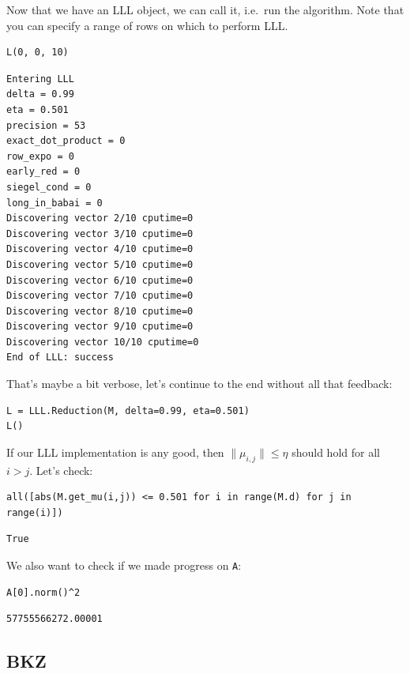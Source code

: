 \documentclass[10pt,a4paper,nobib]{tufte-handout}
\begin{document}
Now that we have an LLL object, we can call it, i.e. run the algorithm. Note that you can specify a range of rows on which to perform LLL.
\lstset{language=Python,label= ,caption= ,captionpos=b,numbers=none}
\begin{lstlisting}
L(0, 0, 10)
\end{lstlisting}

\begin{verbatim}
Entering LLL
delta = 0.99
eta = 0.501
precision = 53
exact_dot_product = 0
row_expo = 0
early_red = 0
siegel_cond = 0
long_in_babai = 0
Discovering vector 2/10 cputime=0
Discovering vector 3/10 cputime=0
Discovering vector 4/10 cputime=0
Discovering vector 5/10 cputime=0
Discovering vector 6/10 cputime=0
Discovering vector 7/10 cputime=0
Discovering vector 8/10 cputime=0
Discovering vector 9/10 cputime=0
Discovering vector 10/10 cputime=0
End of LLL: success
\end{verbatim}

That’s maybe a bit verbose, let’s continue to the end without all that feedback:

\lstset{language=Python,label= ,caption= ,captionpos=b,numbers=none}
\begin{lstlisting}
L = LLL.Reduction(M, delta=0.99, eta=0.501)  
L()
\end{lstlisting}

If our LLL implementation is any good, then \(\|μ_{i,j}\| ≤ η\) should hold for all \(i>j\). Let’s check:
\lstset{language=Python,label= ,caption= ,captionpos=b,numbers=none}
\begin{lstlisting}
all([abs(M.get_mu(i,j)) <= 0.501 for i in range(M.d) for j in range(i)])
\end{lstlisting}

\begin{verbatim}
True
\end{verbatim}


We also want to check if we made progress on \texttt{A}:
\lstset{language=Python,label= ,caption= ,captionpos=b,numbers=none}
\begin{lstlisting}
A[0].norm()^2
\end{lstlisting}

\begin{verbatim}
57755566272.00001
\end{verbatim}

\subsection{BKZ}
\label{sec:org8167ef7}
\end{document}
